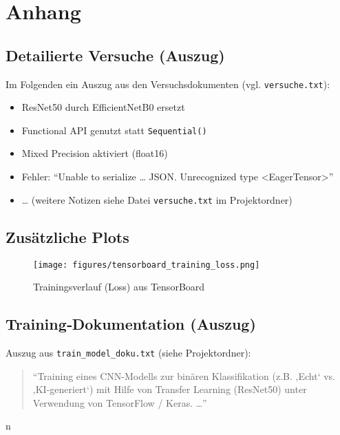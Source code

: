 \chapter{Anhang}
\label{chap:anhang}

\section{Detailierte Versuche (Auszug)}
Im Folgenden ein Auszug aus den Versuchsdokumenten (vgl. \texttt{versuche.txt}):

\begin{itemize}
  \item ResNet50 durch EfficientNetB0 ersetzt  
  \item Functional API genutzt statt \texttt{Sequential()}  
  \item Mixed Precision aktiviert (float16)  
  \item Fehler: \enquote{Unable to serialize … JSON. Unrecognized type <EagerTensor>}  
  \item … (weitere Notizen siehe Datei \texttt{versuche.txt} im Projektordner)
\end{itemize}

\section{Zusätzliche Plots}
\begin{figure}[h]
    \centering
    \texttt{[image: figures/tensorboard\_training\_loss.png]}
    \caption{Trainingsverlauf (Loss) aus TensorBoard}
    \label{fig:tboard_loss}
\end{figure}

\section{Training‐Dokumentation (Auszug)}
Auszug aus \texttt{train_model_doku.txt} (siehe Projektordner):
\begin{quote}
“Training eines CNN-Modells zur binären Klassifikation (z.B. ‚Echt‘ vs. ‚KI-generiert‘) mit Hilfe von Transfer Learning (ResNet50) unter Verwendung von TensorFlow / Keras. …”  
\end{quote}
n